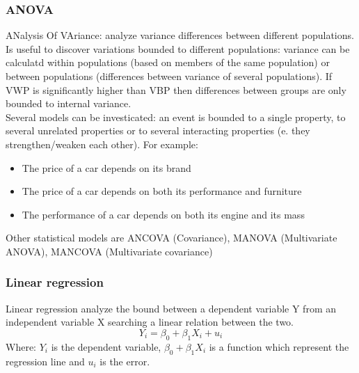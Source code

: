 \subsubsection{ANOVA}
ANalysis Of VAriance: analyze variance differences between different populations. Is useful to discover variations bounded to different populations: variance can be calculatd within populations (based on members of the same population) or between populations (differences between variance of several populations). If VWP is significantly higher than VBP then differences between groups are only bounded to internal variance.\\
Several models can be investicated: an event is bounded to a single property, to several unrelated properties or to several interacting properties (e. they strengthen/weaken each other).
For example:
\begin{itemize}
	\item The price of a car depends on its brand
	\item The price of a car depends on both its performance and furniture
	\item The performance of a car depends on both its engine and its mass 
\end{itemize}
Other statistical models are ANCOVA (Covariance), MANOVA (Multivariate ANOVA), MANCOVA (Multivariate covariance)

\subsubsection{Linear regression}
Linear regression analyze the bound between a dependent variable Y from an independent variable X searching a linear relation between the two.
\begin{equation}
	Y_{i} = \beta_{0} + \beta _{1}X_{i}+u_{i}
\end{equation}
Where: $Y_{i}$ is the dependent variable, $\beta_{0} + \beta _{1}X_{i}$ is a function which represent the regression line and $u_{i}$ is the error.

